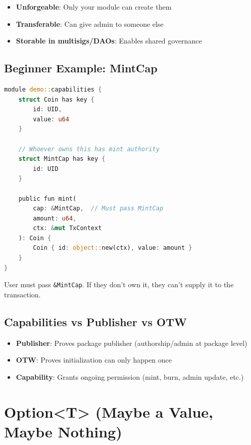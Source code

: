 \documentclass[11pt]{article}
\begin{document}
\begin{itemize}
  \item \textbf{Unforgeable}: Only your module can create them
  \item \textbf{Transferable}: Can give admin to someone else
  \item \textbf{Storable in multisigs/DAOs}: Enables shared governance
\end{itemize}

\subsection{Beginner Example: MintCap}

\begin{lstlisting}[language=Rust]
module demo::capabilities {
    struct Coin has key {
        id: UID,
        value: u64
    }
    
    // Whoever owns this has mint authority
    struct MintCap has key {
        id: UID
    }
    
    public fun mint(
        cap: &MintCap,  // Must pass MintCap
        amount: u64,
        ctx: &mut TxContext
    ): Coin {
        Coin { id: object::new(ctx), value: amount }
    }
}
\end{lstlisting}

\begin{noteBox}
User must pass \texttt{\&MintCap}. If they don't own it, they can't supply it to the transaction.
\end{noteBox}

\subsection{Capabilities vs Publisher vs OTW}

\begin{itemize}
  \item \textbf{Publisher}: Proves package publisher (authorship/admin at package level)
  \item \textbf{OTW}: Proves initialization can only happen once
  \item \textbf{Capability}: Grants ongoing permission (mint, burn, admin update, etc.)
\end{itemize}

\section{Option<T> (Maybe a Value, Maybe Nothing)}
\end{document}
